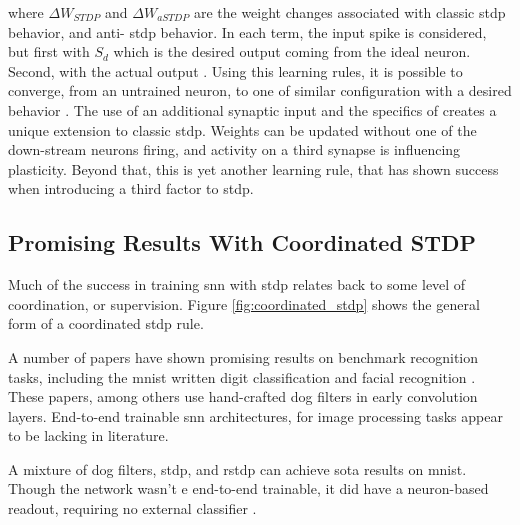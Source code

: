     \noindent where $\Delta W_{STDP}$ and $\Delta W_{aSTDP}$ are the weight
    changes associated with classic \gls{stdp} behavior, and anti- \gls{stdp}
    behavior. In each term, the input spike is considered, but first with
    $S_{d}$ which is the desired output coming from the ideal neuron. Second,
    with the actual output \parencite{mozafari_2018}. Using this learning rules,
    it is possible to converge, from an untrained neuron, to one of similar
    configuration with a desired behavior \parencite{ponulak_2010}. The use of
    an additional synaptic input and the specifics of 
    creates a unique extension to classic \gls{stdp}. Weights can be updated
    without one of the down-stream neurons firing, and activity on a third
    synapse is influencing plasticity. Beyond that, this is yet another learning
    rule, that has shown success when introducing a third factor to \gls{stdp}.



    \subsection{Promising Results With Coordinated STDP}
    Much of the success in training \gls{snn} with \gls{stdp} relates back to
    some level of coordination, or supervision. Figure
    \ref{fig:coordinated_stdp} shows the general form of a coordinated
    \gls{stdp} rule.

    
    A number of papers have shown promising results on benchmark recognition
    tasks, including the \gls{mnist} written digit classification
    \parencite{mozafari_2018} and facial recognition
    \parencite{delorme_2001}. These papers, among others use hand-crafted
    \gls{dog} filters in early convolution layers. End-to-end trainable
    \gls{snn} architectures, for image processing tasks appear to be lacking in
    literature.
    
    A mixture of \gls{dog} filters, \gls{stdp}, and \gls{rstdp} can achieve
    \acrshort{sota} results on \gls{mnist}. Though the network wasn't e end-to-end
    trainable, it did have a neuron-based readout, requiring no external
    classifier \parencite{mozafari_2018}.
    
